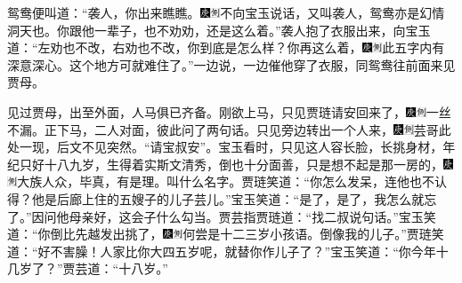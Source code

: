 鸳鸯便叫道：“袭人，你出来瞧瞧。{\includegraphics[width=3mm]{../Images/00004}\includegraphics[width=3mm]{../Images/00011}\footnotesize \kaishu 不向宝玉说话，又叫袭人，鸳鸯亦是幻情洞天也。}你跟他一辈子，也不劝劝，还是这么着。”袭人抱了衣服出来，向宝玉道：“左劝也不改，右劝也不改，你到底是怎么样？你再这么着，{\includegraphics[width=3mm]{../Images/00004}\includegraphics[width=3mm]{../Images/00011}\footnotesize \kaishu 此五字内有深意深心。}这个地方可就难住了。”一边说，一边催他穿了衣服，同鸳鸯往前面来见贾母。

见过贾母，出至外面，人马俱已齐备。刚欲上马，只见贾琏请安回来了，{\includegraphics[width=3mm]{../Images/00004}\includegraphics[width=3mm]{../Images/00011}\footnotesize \kaishu 一丝不漏。}正下马，二人对面，彼此问了两句话。只见旁边转出一个人来，{\includegraphics[width=3mm]{../Images/00004}\includegraphics[width=3mm]{../Images/00011}\footnotesize \kaishu 芸哥此处一现，后文不见突然。}“请宝叔安”。宝玉看时，只见这人容长脸，长挑身材，年纪只好十八九岁，生得着实斯文清秀，倒也十分面善，只是想不起是那一房的，{\includegraphics[width=3mm]{../Images/00004}\includegraphics[width=3mm]{../Images/00011}\footnotesize \kaishu 大族人众，毕真，有是理。}叫什么名字。贾琏笑道：“你怎么发呆，连他也不认得？他是后廊上住的五嫂子的儿子芸儿。”宝玉笑道：“是了，是了，我怎么就忘了。”因问他母亲好，这会子什么勾当。贾芸指贾琏道：“找二叔说句话。”宝玉笑道：“你倒比先越发出挑了，{\includegraphics[width=3mm]{../Images/00004}\includegraphics[width=3mm]{../Images/00011}\footnotesize \kaishu 何尝是十二三岁小孩语。}倒像我的儿子。”贾琏笑道：“好不害臊！人家比你大四五岁呢，就替你作儿子了？”宝玉笑道：“你今年十几岁了？”贾芸道：“十八岁。”

